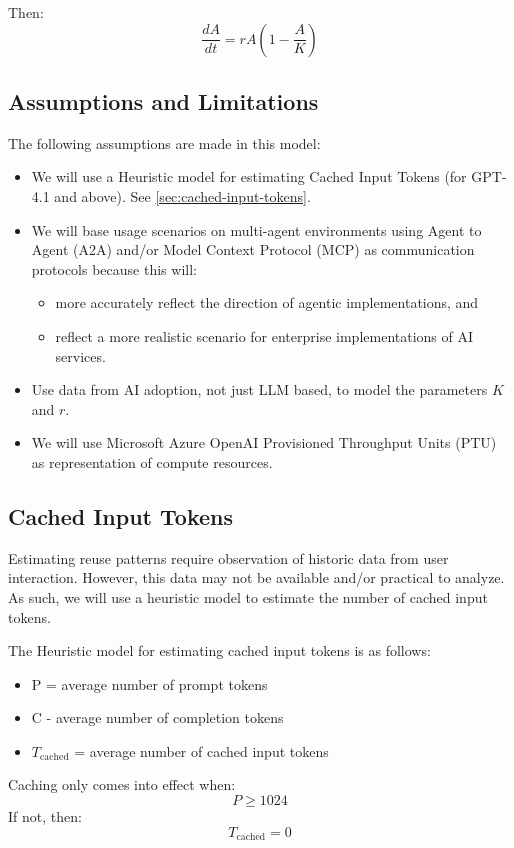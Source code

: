\documentclass[10pt,twocolumn]{article}
\begin{document}
Then:
\begin{equation}
	\frac{dA}{dt} = r A \left(1 - \frac{A}{K}\right)
	\label{eq:CoreModel}
\end{equation}

\subsection{Assumptions and Limitations}
The following assumptions are made in this model:
\begin{itemize}
	\item We will use a Heuristic model for estimating Cached Input Tokens (for GPT-4.1 and above). See \autoref{sec:cached-input-tokens}.
	\item We will base usage scenarios on multi-agent environments using Agent to Agent (A2A) and/or Model Context Protocol (MCP) as communication protocols because this will:
	\begin{itemize}
		\item more accurately reflect the direction of agentic implementations, and
		\item reflect a more realistic scenario for enterprise implementations of AI services.
	\end{itemize}
	\item Use data from AI adoption, not just LLM based, to model the parameters $K$ and $r$.
	\item We will use Microsoft Azure OpenAI Provisioned Throughput Units (PTU) as representation of compute resources.
\end{itemize}

\subsection{Cached Input Tokens}
\label{sec:cached-input-tokens}
Estimating reuse patterns require observation of historic data from user interaction. However, this data may not be available and/or practical to analyze. As such, we will use a heuristic model to estimate the number of cached input tokens.

The Heuristic model for estimating cached input tokens is as follows:
\begin{itemize}
	\item P = average number of prompt tokens
	\item  C - average number of completion tokens
	\item $T_{\text{cached}}$ = average number of cached input tokens
\end{itemize}
Caching only comes into effect when:
\[P \geq 1024\]
If not, then:
\[T_{\text{cached}} = 0\]
\end{document}
